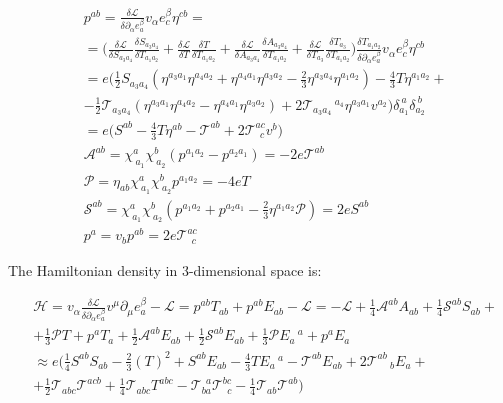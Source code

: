 \documentclass[11pt]{book}
\begin{document}
\begin{equation}\begin{aligned}
    &p^{a b}=\frac{\delta\mathcal{L}}{\delta \partial_{\alpha}{e^{\beta}_{a}}}v_{\alpha} e^{\beta}_{c}\eta^{c b}=\\
    &=\bigl(\frac{\delta\mathcal{L}}{\delta S_{a_3 a_4}}\frac{\delta S_{a_3 a_4}}{\delta T_{a_1 a_2}}
    +\frac{\delta\mathcal{L}}{\delta T}\frac{\delta T}{\delta T_{a_1 a_2}}
    +\frac{\delta\mathcal{L}}{\delta A_{a_3 a_4}}\frac{\delta A_{a_3 a_4}}{\delta T_{a_1 a_2}}
    +\frac{\delta\mathcal{L}}{\delta T_{a_3}}\frac{\delta T_{a_3}}{\delta T_{a_1 a_2}}\bigr)
    \frac{\delta T_{a_1 a_2}}{\delta \partial_{\alpha}{e^{\beta}_{a}}} v_{\alpha}e^{\beta}_{c}\eta^{c b}\\
    &=e\biggl(\frac{1}{2}S_{a_3 a_4}(\eta^{a_3 a_1}\eta^{a_4 a_2}+\eta^{a_4 a_1}\eta^{a_3 a_2}-\frac{2}{3}\eta^{a_3 a_4}\eta^{a_1 a_2})
    -\frac{4}{3}T \eta^{a_1 a_2}+\\
    &-\frac{1}{2} \mathcal{T}_{a_3 a_4} (\eta^{a_3 a_1}\eta^{a_4 a_2}
    -\eta^{a_4 a_1}\eta^{a_3 a_2})+2 \mathcal{T}_{a_3 a_4}\,^{a_4} \eta^{a_3 a_1} v^{a_2}\biggr)
    \delta_{a_1}^{\ a}\delta_{a_2}^{\ b}\\
    &=e\biggl(S^{a b}
    -\frac{4}{3}T \eta^{a b}-\mathcal{T}^{a b}+2 \mathcal{T}^{a c}_{\ \ c} v^{b}\biggr)\\
    &\mathcal{A}^{a b}=\chi^{a}_{\ a_1} \chi^{b}_{\ a_2}(p^{a_1 a_2}-p^{a_2 a_1})=
    -2 e \mathcal{T}^{a b}\\
    &\mathcal{P}=\eta_{a b}\chi^{a}_{\ a_1} \chi^{b}_{\ a_2} p^{a_1 a_2}=-4 e T\\
    &\mathcal{S}^{a b}=\chi^{a}_{\ a_1} \chi^{b}_{\ a_2}
    (p^{a_1 a_2}+p^{a_2 a_1}-\frac{2}{3}\eta^{a_1 a_2} \mathcal{P})=2 e S^{a b}\\
    &p^{a}=v_b p^{a b}=2 e \mathcal{T}^{a c}_{\ \ c}\end{aligned}\end{equation}

The Hamiltonian density in 3-dimensional space is:

\begin{equation}\begin{aligned}
    &\mathcal{H}=v_{\alpha}\frac{\delta\mathcal{L}}{\delta \partial_{\alpha}{e^{\beta}_{a}}}v^{\mu}\partial_{\mu} e^{\beta}_{a}-\mathcal{L}=
    p^{a b}T_{a b}+p^{a b}E_{a b}-\mathcal{L}=-\mathcal{L}+\frac{1}{4}\mathcal{A}^{a b} A_{a b}+\frac{1}{4}\mathcal{S}^{a b}S_{a b}+\\
    &+\frac{1}{3}\mathcal{P} T+p^{a} T_{a}+\frac{1}{2}\mathcal{A}^{a b} E_{a b}+\frac{1}{2}\mathcal{S}^{a b}E_{a b}
    +\frac{1}{3}\mathcal{P} E_{a}\,^{a}+p^{a} E_{a}\\
    &\approx e\biggl(\frac{1}{4}S^{a b} S_{a b} - \frac{2}{3}(T)^2
    +S^{a b}E_{a b}-\frac{4}{3}T E_{a}\,^{a}-\mathcal{T}^{a b} E_{a b} +2 \mathcal{T}^{a b}\,_b E_{a}+\\ 
    &+ \frac{1}{2}\mathcal{T}_{a b c} \mathcal{T}^{a c b} + \frac{1}{4} \mathcal{T}_{a b c} T^{a b c}-\mathcal{T}_{b a}^{\ \ a} \mathcal{T}^{b c}_{\ \ c}-\frac{1}{4}\mathcal{T}_{a b} \mathcal{T}^{a b}\biggr)\end{aligned}\end{equation}
\end{document}

